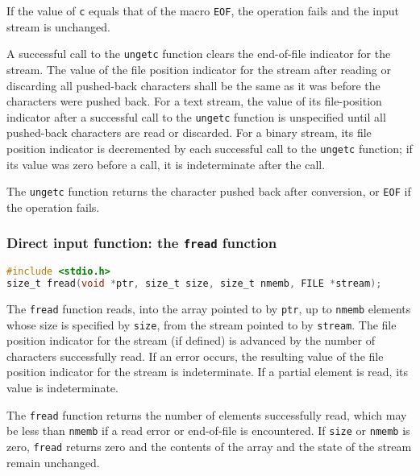 If the value of \texttt{c} equals that of the macro \texttt{EOF}, the operation
fails and the input stream is unchanged.

A successful call to the \texttt{ungetc} function clears the end-of-file
indicator for the stream. The value of the file position indicator for the
stream after reading or discarding all pushed-back characters shall be the same
as it was before the characters were pushed back. For a text stream, the value
of its file-position indicator after a successful call to the \texttt{ungetc}
function is unspecified until all pushed-back characters are read or discarded.
For a binary stream, its file position indicator is decremented by each
successful call to the \texttt{ungetc} function; if its value was zero before a
call, it is indeterminate after the call.

The \texttt{ungetc} function returns the character pushed back after
conversion, or \texttt{EOF} if the operation fails.

\subsubsection{Direct input function: the \texttt{fread} function}
\lstset{basicstyle=\scriptsize, numbers=left, captionpos=b, tabsize=4}
\begin{lstlisting}[caption=Section \thesection listing \arabic{filecnt},language={C},
breaklines=true,xleftmargin=15pt,label=lst:section\thesection listing\arabic{filecnt}]
#include <stdio.h>
size_t fread(void *ptr, size_t size, size_t nmemb, FILE *stream);
\end{lstlisting}

The \texttt{fread} function reads, into the array pointed to by \texttt{ptr},
up to \texttt{nmemb} elements whose size is specified by \texttt{size}, from
the stream pointed to by \texttt{stream}. The file position indicator for the
stream (if defined) is advanced by the number of characters successfully read.
If an error occurs, the resulting value of the file position indicator for the
stream is indeterminate. If a partial element is read, its value is
indeterminate.

The \texttt{fread} function returns the number of elements successfully read,
which may be less than \texttt{nmemb} if a read error or end-of-file is
encountered. If \texttt{size} or \texttt{nmemb} is zero, \texttt{fread} returns
zero and the contents of the array and the state of the stream remain
unchanged.

